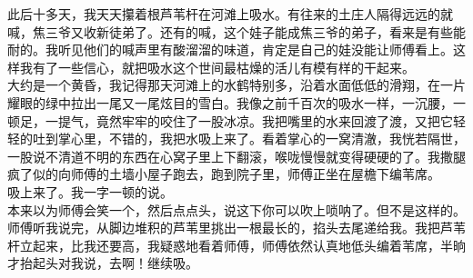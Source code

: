 此后十多天，我天天攥着根芦苇杆在河滩上吸水。有往来的土庄人隔得远远的就喊，焦三爷又收新徒弟了。还有的喊，这个娃子能成焦三爷的弟子，看来是有些能耐的。我听见他们的喊声里有酸溜溜的味道，肯定是自己的娃没能让师傅看上。这样我有了一些信心，就把吸水这个世间最枯燥的活儿有模有样的干起来。
\\

大约是一个黄昏，我记得那天河滩上的水鹤特别多，沿着水面低低的滑翔，在一片耀眼的绿中拉出一尾又一尾炫目的雪白。我像之前千百次的吸水一样，一沉腰，一顿足，一提气，竟然牢牢的咬住了一股冰凉。我把嘴里的水来回渡了渡，又把它轻轻的吐到掌心里，不错的，我把水吸上来了。看着掌心的一窝清澈，我恍若隔世，一股说不清道不明的东西在心窝子里上下翻滚，喉咙慢慢就变得硬硬的了。我撒腿疯了似的向师傅的土墙小屋子跑去，跑到院子里，师傅正坐在屋檐下编苇席。
\\

吸上来了。我一字一顿的说。
\\

本来以为师傅会笑一个，然后点点头，说这下你可以吹上唢呐了。但不是这样的。师傅听我说完，从脚边堆积的芦苇里挑出一根最长的，掐头去尾递给我。我把芦苇杆立起来，比我还要高，我疑惑地看着师傅，师傅依然认真地低头编着苇席，半晌才抬起头对我说，去啊！继续吸。
\\
